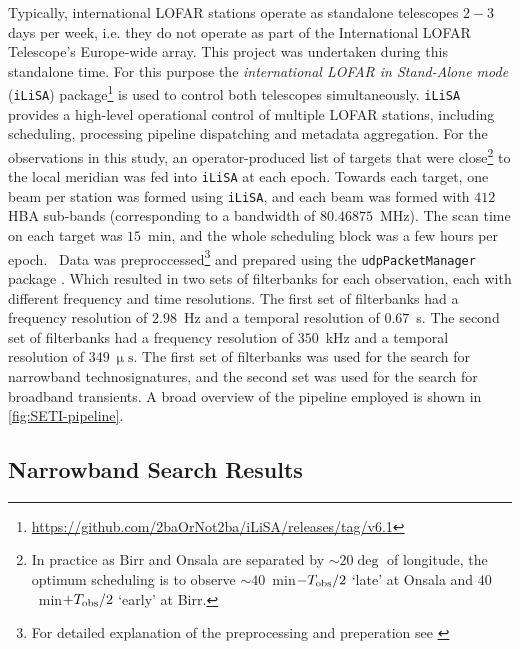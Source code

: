 Typically, international LOFAR stations operate as standalone telescopes $2-3$ days per week, i.e. they do not operate as part of the International LOFAR Telescope's Europe-wide array. This project was undertaken during this standalone time. For this purpose the \emph{international LOFAR in Stand-Alone mode} (\texttt{iLiSA}) package\footnote{\url{https://github.com/2baOrNot2ba/iLiSA/releases/tag/v6.1}} is used to control both telescopes simultaneously. \texttt{iLiSA} provides a high-level operational control of multiple LOFAR stations, including scheduling, processing pipeline dispatching and metadata aggregation. For the observations in this study, an operator-produced list of targets that were close\footnote{In practice as Birr and Onsala are separated by $\sim20\deg$ of longitude, the optimum scheduling is to observe $\sim 40$~min$-T_{\rm obs}/2$ `late' at Onsala and $40$~min$+T_{\rm obs}/2$ `early' at Birr.} to the local meridian was fed into \texttt{iLiSA} at each epoch. Towards each target, one beam per station was formed using \texttt{iLiSA}, and each beam was formed with $412$ HBA sub-bands (corresponding to a bandwidth of $80.46875$~MHz). The scan time on each target was $15$~min, and the whole scheduling block was a few hours per epoch. \ 
Data was preproccessed\footnote{For detailed explanation of the preprocessing and preperation see \cite{2019_Lebofsky}} and prepared using the \texttt{udpPacketManager} package \citep{David_JOSS}. Which resulted in two sets of filterbanks for each observation, each with different frequency and time resolutions. The first set of filterbanks had a frequency resolution of $2.98$~Hz and a temporal resolution of $0.67$~s. The second set of filterbanks had a frequency resolution of $350$~kHz and a temporal resolution of $349~\upmu\text{s}$. The first set of filterbanks was used for the search for narrowband technosignatures, and the second set was used for the search for broadband transients. A broad overview of the pipeline employed is shown in \cref{fig:SETI-pipeline}. \

\subsection{Narrowband Search Results}

